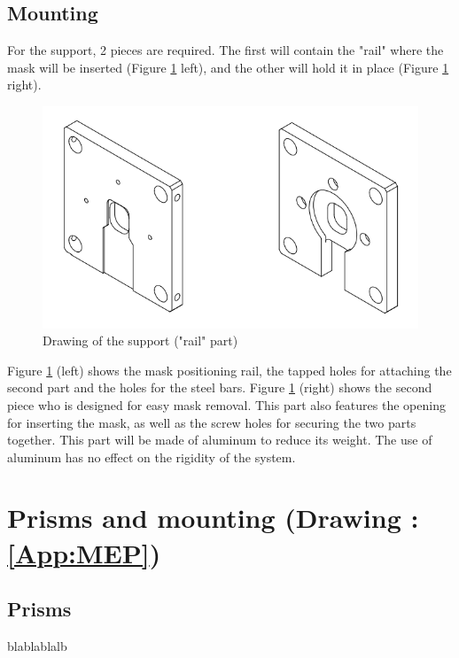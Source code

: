 \subsection{Mounting}
For the support, 2 pieces are required. The first will contain the "rail" where the mask will be inserted (Figure \ref{fig:Mec_Mask_Sup_Rail} left),
 and the other will hold it in place (Figure \ref{fig:Mec_Mask_Sup_Rail} right).
\begin{figure}[H]
    \centering
    \includegraphics[scale=0.8]{assets/figures/Mechanical Design/Support_masque_rail.png}
    \caption{Drawing of the support ("rail" part)}
    \label{fig:Mec_Mask_Sup_Rail}
\end{figure}
Figure \ref{fig:Mec_Mask_Sup_Rail} (left) shows the mask positioning rail, the tapped holes for attaching the second part and the holes 
for the steel bars. \newline
Figure \ref{fig:Mec_Mask_Sup_Rail} (right) shows the second piece who is designed for easy mask removal. This part also features the opening 
for inserting the mask, as well as the screw holes for securing the two parts together.\bigbreak
This part will be made of aluminum to reduce its weight. The use of aluminum has no effect on the rigidity of the system.

\section{Prisms and mounting (Drawing : \ref{App:MEP})}\label{sec:prisms}
\subsection{Prisms}
blablablalb
